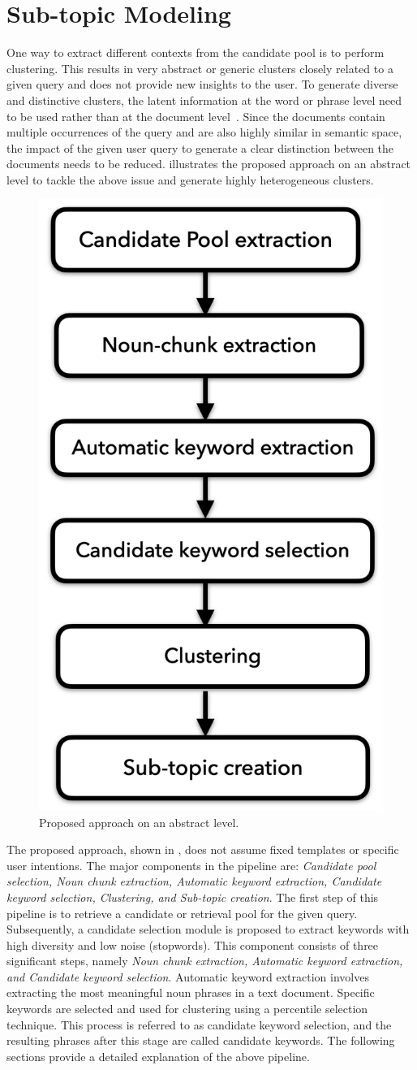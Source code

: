 
\chapter{Sub-topic Modeling}

One way to extract different contexts from the candidate pool is to perform clustering. This results in very abstract or generic clusters closely related to a given query and does not provide new insights to the user. To generate diverse and distinctive clusters, the latent information at the word or phrase level need to be used rather than at the document level~\cite{blei2003latent}. Since the documents contain multiple occurrences of the query and are also highly similar in semantic space, the impact of the given user query to generate a clear distinction between the documents needs to be reduced.  illustrates the proposed approach on an abstract level to tackle the above issue and generate highly heterogeneous clusters.


\begin{figure}[h]
	\centering
	\includegraphics[width=.35\textwidth]{images/thesis_images/methodology.png}
	\caption{Proposed approach on an abstract level. \label{fig:methodology2}}
\end{figure}

The proposed approach, shown in , does not assume fixed templates or specific user intentions. The major components in the pipeline are: \emph{Candidate pool selection, Noun chunk extraction, Automatic keyword extraction, Candidate keyword selection, Clustering, and Sub-topic creation}. The first step of this pipeline is to retrieve a candidate or retrieval pool for the given query. Subsequently, a candidate selection module is proposed to extract keywords with high diversity and low noise (stopwords). This component consists of three significant steps, namely \emph{Noun chunk extraction, Automatic keyword extraction, and Candidate keyword selection}. Automatic keyword extraction involves extracting the most meaningful noun phrases in a text document. Specific keywords are selected and used for clustering using a percentile selection technique. This process is referred to as candidate keyword selection, and the resulting phrases after this stage are called candidate keywords. The following sections provide a detailed explanation of the above pipeline.




